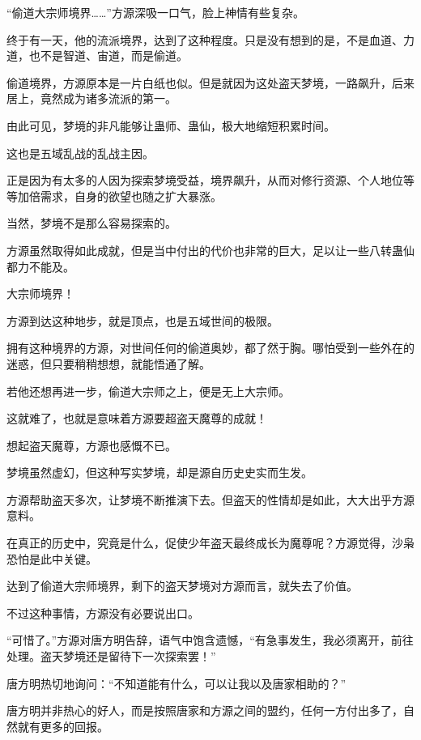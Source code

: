 
\begin{this_body}



“偷道大宗师境界……”方源深吸一口气，脸上神情有些复杂。

终于有一天，他的流派境界，达到了这种程度。只是没有想到的是，不是血道、力道，也不是智道、宙道，而是偷道。

偷道境界，方源原本是一片白纸也似。但是就因为这处盗天梦境，一路飙升，后来居上，竟然成为诸多流派的第一。

由此可见，梦境的非凡能够让蛊师、蛊仙，极大地缩短积累时间。

这也是五域乱战的乱战主因。

正是因为有太多的人因为探索梦境受益，境界飙升，从而对修行资源、个人地位等等加倍需求，自身的欲望也随之扩大暴涨。

当然，梦境不是那么容易探索的。

方源虽然取得如此成就，但是当中付出的代价也非常的巨大，足以让一些八转蛊仙都力不能及。

大宗师境界！

方源到达这种地步，就是顶点，也是五域世间的极限。

拥有这种境界的方源，对世间任何的偷道奥妙，都了然于胸。哪怕受到一些外在的迷惑，但只要稍稍想想，就能悟通了解。

若他还想再进一步，偷道大宗师之上，便是无上大宗师。

这就难了，也就是意味着方源要超盗天魔尊的成就！

想起盗天魔尊，方源也感慨不已。

梦境虽然虚幻，但这种写实梦境，却是源自历史史实而生发。

方源帮助盗天多次，让梦境不断推演下去。但盗天的性情却是如此，大大出乎方源意料。

在真正的历史中，究竟是什么，促使少年盗天最终成长为魔尊呢？方源觉得，沙枭恐怕是此中关键。

达到了偷道大宗师境界，剩下的盗天梦境对方源而言，就失去了价值。

不过这种事情，方源没有必要说出口。

“可惜了。”方源对唐方明告辞，语气中饱含遗憾，“有急事发生，我必须离开，前往处理。盗天梦境还是留待下一次探索罢！”

唐方明热切地询问：“不知道能有什么，可以让我以及唐家相助的？”

唐方明并非热心的好人，而是按照唐家和方源之间的盟约，任何一方付出多了，自然就有更多的回报。


\end{this_body}
